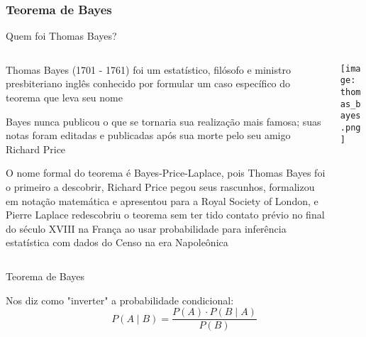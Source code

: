 \subsubsection{Teorema de Bayes}
\begin{frame}{Quem foi Thomas Bayes?}
	\begin{columns}
		\begin{column}{0.8\textwidth}
			\begin{vfilleditems}
				\item \small Thomas Bayes (1701 - 1761) foi um estatístico, filósofo
				e ministro presbiteriano inglês conhecido por formular um caso
				específico do teorema que leva seu nome
				\item \small Bayes nunca publicou o que se tornaria sua realização mais famosa;
				suas notas foram editadas e publicadas após sua morte pelo seu amigo
				Richard Price
				\item \small O nome formal do teorema é Bayes-Price-Laplace, pois Thomas
				Bayes foi o primeiro a descobrir, Richard Price pegou seus rascunhos,
				formalizou em notação matemática e apresentou para a Royal Society of London,
				e Pierre Laplace redescobriu o teorema sem ter tido contato prévio no final
				do século XVIII na França ao usar probabilidade para inferência estatística
				com dados do Censo na era Napoleônica
			\end{vfilleditems}
		\end{column}
		\begin{column}{0.2\textwidth}
			\centering
			\texttt{[image: thomas\_bayes.png]}
		\end{column}
	\end{columns}
\end{frame}


\begin{frame}{Teorema de Bayes}
	\begin{theo}[Bayes]
		Nos diz como "inverter" a probabilidade condicional: \newline \newline
		$$P(A \mid B) = \frac{P(A) \cdot P(B \mid A)}{P(B)}$$
	\end{theo}
\end{frame}


